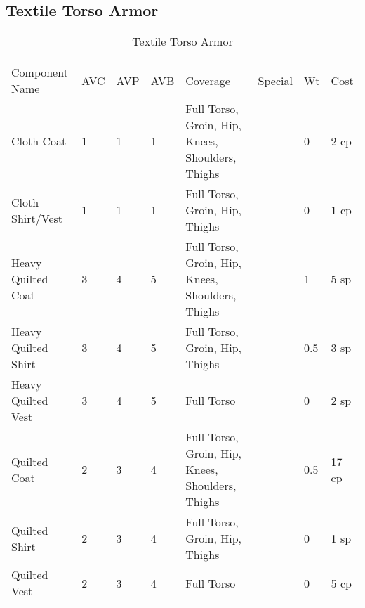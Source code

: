 \documentclass[oneside,11pt,english]{book}
\begin{document}
\subsection{Textile Torso Armor}
\begin{longtabu} to 
  \captionsetup{textformat=empty, labelformat=blank}
  \caption{Textile Torso Armor} \vspace{-15pt}
  \label{tab:Textile Torso Armor}\\
  Component Name&AVC&AVP&AVB& Coverage& Special& Wt&Cost\\\toprule
  Cloth Coat& 1& 1& 1& Full Torso, Groin, Hip, Knees, Shoulders, Thighs& & 0& 2 cp\\
  Cloth Shirt/Vest& 1& 1& 1& Full Torso, Groin, Hip, Thighs& & 0& 1 cp\\
  Heavy Quilted Coat& 3& 4& 5& Full Torso, Groin, Hip, Knees, Shoulders, Thighs& & 1& 5 sp\\
  Heavy Quilted Shirt& 3& 4& 5& Full Torso, Groin, Hip, Thighs& & 0.5& 3 sp\\
  Heavy Quilted Vest& 3& 4& 5& Full Torso& & 0& 2 sp\\
  Quilted Coat& 2& 3& 4& Full Torso, Groin, Hip, Knees, Shoulders, Thighs& & 0.5& 17 cp\\
  Quilted Shirt& 2& 3& 4& Full Torso, Groin, Hip, Thighs& & 0& 1 sp\\
  Quilted Vest& 2& 3& 4& Full Torso& & 0& 5 cp\\
\end{longtabu}
\end{document}
